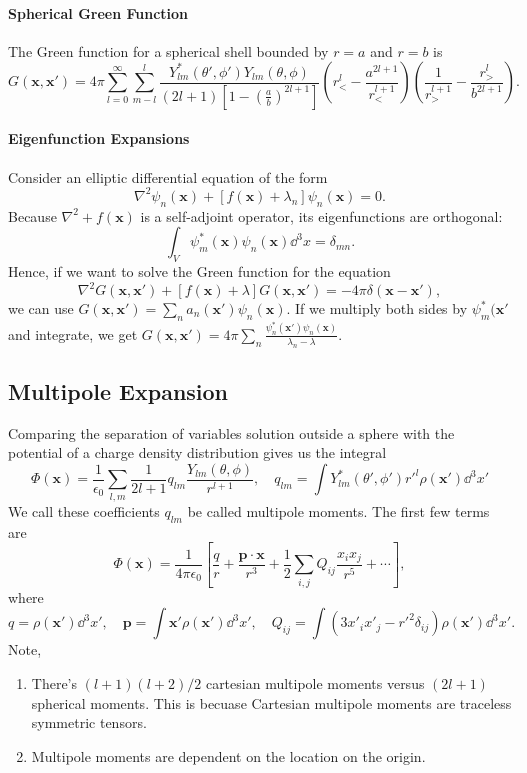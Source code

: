 \documentclass{article}
\begin{document}
\paragraph{Spherical Green Function}
The Green function for a spherical shell bounded by $r=a$ and $r=b$ is 
$$G(\mathbf x,\mathbf x')=4\pi\sum^\infty_{l=0}\sum^l_{m-l}\frac{Y^*_{lm}(\theta',\phi')Y_{lm}(\theta,\phi)}{(2l+1)\left[1-\left(\frac ab\right)^{2l+1}\right]}\left(r^l_<-\frac{a^{2l+1}}{r^{l+1}_<}\right)\left(\frac 1{r^{l+1}_>}-\frac{r^l_>}{b^{2l+1}}\right).$$
\paragraph{Eigenfunction Expansions}
Consider an elliptic differential equation of the form 
$$\nabla^2\psi_n(\mathbf x)+[f(\mathbf x)+\lambda_n]\psi_n(\mathbf x)=0.$$
Because $\nabla^2+f(\mathbf x)$ is a self-adjoint operator, its eigenfunctions are orthogonal:
$$\int_V\psi^*_m(\mathbf x)\psi_n(\mathbf x)\dd^3x=\delta_{mn}.$$
Hence, if we want to solve the Green function for the equation
$$\nabla^2G(\mathbf x,\mathbf x')+[f(\mathbf x)+\lambda]G(\mathbf x,\mathbf x')=-4\pi\delta(\mathbf x-\mathbf x'),$$
we can use $G(\mathbf x,\mathbf x')=\sum_na_n(\mathbf x')\psi_n(\mathbf x).$ If we multiply both sides by $\psi^*_m(\mathbf x'$ and integrate, we get $G(\mathbf x,\mathbf x')=4\pi\sum_n\frac{\psi^*_n(\mathbf x')\psi_n(\mathbf x)}{\lambda_n-\lambda}.$

\subsection{Multipole Expansion}
Comparing the separation of variables solution outside a sphere with the potential of a charge density distribution gives us the integral 
$$\Phi(\mathbf x)=\frac 1{\epsilon_0}\sum_{l,m}\frac 1{2l+1}q_{lm}\frac{Y_{lm}(\theta,\phi)}{r^{l+1}},\quad q_{lm}=\int Y^*_{lm}(\theta',\phi'){r'}^l\rho(\mathbf x')\dd^3x'$$
We call these coefficients $q_{lm}$ be called multipole moments. The first few terms are 
$$\Phi(\mathbf x)=\frac 1{4\pi\epsilon_0}\left[\frac qr+\frac{\mathbf p\cdot\mathbf x}{r^3}+\frac 12\sum_{i,j}Q_{ij}\frac{x_ix_j}{r^5}+\cdots\right],$$
where 
$$q=\rho(\mathbf x')\dd^3x',\quad \mathbf p=\int\mathbf x'\rho(\mathbf x')\dd^3x',\quad Q_{ij}=\int(3x'_ix'_j-{r'}^2\delta_{ij})\rho(\mathbf x')\dd^3x'.$$
Note,
\begin{enumerate}
    \item There's $(l+1)(l+2)/2$ cartesian multipole moments versus $(2l+1)$ spherical moments. This is becuase Cartesian multipole moments are traceless symmetric tensors.
    \item Multipole moments are dependent on the location on the origin.
\end{enumerate}
\end{document}
